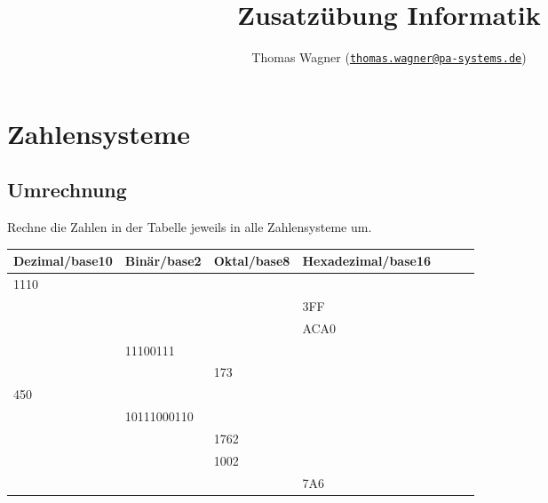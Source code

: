 \documentclass[]{scrartcl}
\title{Zusatzübung Informatik}
\author{Thomas Wagner (\href{mailto:thomas.wagner@pa-systems.de}{\texttt{thomas.wagner@pa-systems.de}})}
\begin{document}
\lstset{style=CStyle}

\maketitle

\section{Zahlensysteme}

\subsection{Umrechnung}
Rechne die Zahlen in der Tabelle jeweils in alle Zahlensysteme um.

\begin{table}[h!]
	\centering
	\begin{tabular}{l|l|l|llll}
		\multicolumn{1}{c|}{\textbf{Dezimal/base10}} &
		\multicolumn{1}{c|}{\textbf{Binär/base2}} &
		\multicolumn{1}{c|}{\textbf{Oktal/base8}} &
		\multicolumn{1}{c}{\textbf{Hexadezimal/base16}} &
		\multicolumn{1}{c}{\textbf{}} &
		\multicolumn{1}{c}{\textbf{}} &
		\multicolumn{1}{c}{\textbf{}} \\ \hline
		1110 &             &      &      &  &  &  \\ \hline
		     &             &      & 3FF  &  &  &  \\ \hline
		     &             &      & ACA0 &  &  &  \\ \hline
		     & 11100111    &      &      &  &  &  \\ \hline
		     &             & 173  &      &  &  &  \\ \hline
		450  &             &      &      &  &  &  \\ \hline
		     & 10111000110 &      &      &  &  &  \\ \hline
		     &             & 1762 &      &  &  &  \\ \hline
		     &             & 1002 &      &  &  &  \\ \hline
		     &             &      & 7A6  &  &  &
	\end{tabular}
\end{table}
\end{document}
